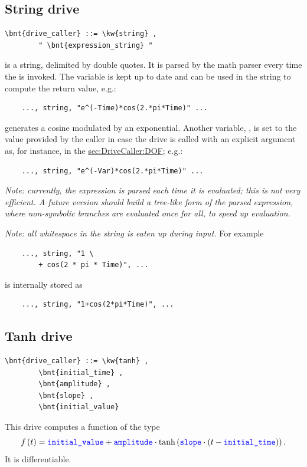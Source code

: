 \subsection{String drive}
\begin{Verbatim}[commandchars=\\\{\}]
    \bnt{drive_caller} ::= \kw{string} ,
        " \bnt{expression_string} "
\end{Verbatim}
 is a string, delimited by double quotes.
It is parsed by the math parser every time 
the  is invoked.
The variable  is kept up to date and can be used in the 
string to compute the return value, e.g.:
\begin{verbatim}
    ..., string, "e^(-Time)*cos(2.*pi*Time)" ...
\end{verbatim}
generates a cosine modulated by an exponential.
Another variable, , is set to the value provided by the caller
in case the drive is called with an explicit argument as, for instance,
in the \hyperref{\kw{dof drive}}{\kw{dof drive} (see Section~}{)}{sec:DriveCaller:DOF};
e.g.:
\begin{verbatim}
    ..., string, "e^(-Var)*cos(2.*pi*Time)" ...
\end{verbatim}

\emph{Note: currently, the expression is parsed each time it is evaluated;
this is not very efficient.
A future version should build a tree-like form of the
parsed expression, where non-symbolic branches are evaluated once for all,
to speed up evaluation.}

\emph{Note: all whitespace in the string is eaten up during input.}
For example
\begin{verbatim}
    ..., string, "1 \
        + cos(2 * pi * Time)", ...
\end{verbatim}
is internally stored as
\begin{verbatim}
    ..., string, "1+cos(2*pi*Time)", ...
\end{verbatim}


\subsection{Tanh drive}
\begin{Verbatim}[commandchars=\\\{\}]
    \bnt{drive_caller} ::= \kw{tanh} ,
        \bnt{initial_time} ,
        \bnt{amplitude} ,
        \bnt{slope} ,
        \bnt{initial_value}
\end{Verbatim}
This drive computes a function of the type
\begin{displaymath}
	f\left( t \right) = \textcolor{blue}{\texttt{initial\_value}} + \textcolor{blue}{\texttt{amplitude}} \cdot\mathrm{tanh}\left( 
			\textcolor{blue}{\texttt{slope}} \cdot \left( 
				t - \textcolor{blue}{\texttt{initial\_time}}
			 \right)
		 \right) .
\end{displaymath}
It is differentiable.

